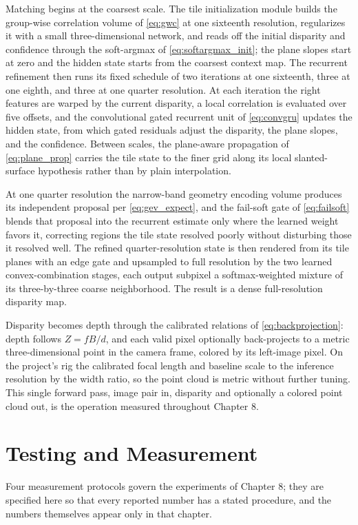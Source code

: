 Matching begins at the coarsest scale. The tile initialization module
builds the group-wise correlation volume of \eqref{eq:gwc} at one
sixteenth resolution, regularizes it with a small three-dimensional
network, and reads off the initial disparity and confidence through the
soft-argmax of \eqref{eq:softargmax_init}; the plane slopes start at zero
and the hidden state starts from the coarsest context map. The recurrent
refinement then runs its fixed schedule of two iterations at one
sixteenth, three at one eighth, and three at one quarter resolution. At
each iteration the right features are warped by the current disparity, a
local correlation is evaluated over five offsets, and the convolutional
gated recurrent unit of \eqref{eq:convgru} updates the hidden state, from
which gated residuals adjust the disparity, the plane slopes, and the
confidence. Between scales, the plane-aware propagation of
\eqref{eq:plane_prop} carries the tile state to the finer grid along its
local slanted-surface hypothesis rather than by plain interpolation.

At one quarter resolution the narrow-band geometry encoding volume
produces its independent proposal per \eqref{eq:gev_expect}, and the
fail-soft gate of \eqref{eq:failsoft} blends that proposal into the
recurrent estimate only where the learned weight favors it, correcting
regions the tile state resolved poorly without disturbing those it
resolved well. The refined quarter-resolution state is then rendered
from its tile planes with an edge gate and upsampled to full resolution
by the two learned convex-combination stages, each output subpixel a
softmax-weighted mixture of its three-by-three coarse neighborhood. The
result is a dense full-resolution disparity map.

Disparity becomes depth through the calibrated relations of
\eqref{eq:backprojection}: depth follows $Z = fB/d$, and each valid pixel
optionally back-projects to a metric three-dimensional point in the
camera frame, colored by its left-image pixel. On the project's rig the
calibrated focal length and baseline scale to the inference resolution by
the width ratio, so the point cloud is metric without further tuning.
This single forward pass, image pair in, disparity and optionally a
colored point cloud out, is the operation measured throughout Chapter 8.

\FloatBarrier
\section{Testing and Measurement}
\label{sec:testing_protocols}
Four measurement protocols govern the experiments of Chapter 8; they are
specified here so that every reported number has a stated procedure, and
the numbers themselves appear only in that chapter.

